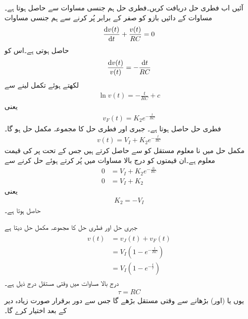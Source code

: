 آئیں اب فطری حل دریافت کریں۔فطری حل ہم جنسی مساوات سے حاصل ہوتا ہے۔مساوات  کے دائیں بازو کو صفر کے برابر پُر کرنے سے ہم جنسی مساوات
\begin{align}\label{مساوات_عارضی_برق_گیر_ہم_جنسی_الف}
\frac{\dif v(t)}{\dif t}+\frac{v(t)}{RC}=0
\end{align}
 حاصل ہوتی ہے۔اس کو
\begin{align*}
\frac{\dif v(t)}{v(t)}=-\frac{\dif t}{RC}
\end{align*}
لکھتے ہوئے تکمل لینے سے
\begin{align*}
\ln v(t)=-\frac{t}{RC}+c
\end{align*}
یعنی
\begin{align*}
v_F(t)=K_2 e^{-\frac{t}{RC}}
\end{align*}
فطری حل حاصل ہوتا ہے۔ جبری اور فطری حل کا مجموعہ مکمل حل ہو گا۔
\begin{align*}
v(t)=V_I+K_2 e^{-\frac{t}{RC}}
\end{align*}
مکمل حل میں نا معلوم مستقل کو  سے حاصل کرتے ہیں جس کے تحت  پر  کی قیمت معلوم ہے۔ان قیمتوں کو درج بالا مساوات میں پُر کرتے ہوئے حل کرنے سے
\begin{align*}
0&=V_I+K_2 e^{-\frac{0}{RC}}\\
0&=V_I+K_2
\end{align*}
یعنی
\begin{align*}
K_2=-V_I
\end{align*}
حاصل ہوتا ہے۔ 

جبری حل اور فطری حل کا مجموعہ مکمل حل دیتا ہے
\begin{gather}
\begin{aligned}
v(t)&=v_J(t)+v_F(t)\\
&=V_I\left(1-e^{-\frac{t}{RC}}\right)\\
&=V_I\left(1-e^{-\frac{t}{\tau}}\right)
\end{aligned}
\end{gather}
درج بالا مساوات میں وقتی مستقل درج ذیل ہے۔
\begin{align}
\tau=RC
\end{align}
یوں  یا (اور)  بڑھانے سے  وقتی مستقل بڑھے گا جس سے دور برقرار صورت زیادہ دیر کے بعد اختیار کرے گا۔ 

